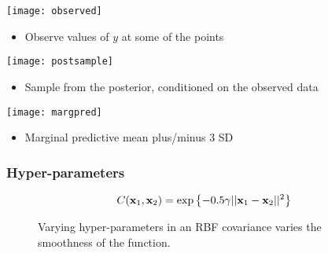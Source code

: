 \begin{frame}
	\texttt{[image: observed]}
	\begin{itemize}
		\item Observe values of $y$ at some of the points
	\end{itemize}
\end{frame}

\begin{frame}
	\texttt{[image: postsample]}
	\begin{itemize}
		\item Sample from the posterior, conditioned on the observed data
	\end{itemize}
\end{frame}

\begin{frame}
	\texttt{[image: margpred]}
	\begin{itemize}
		\item Marginal predictive mean plus/minus 3 SD 
	\end{itemize}
\end{frame}


\begin{frame}
	\frametitle{Hyper-parameters}
	\[
C(\mathbf{x}_1,\mathbf{x}_2) = \exp\left\{-0.5\gamma ||\mathbf{x}_1 - \mathbf{x}_2||^2 \right\}
	\]
	\begin{figure}[tbh]
		\centering\caption{\label{fig:hyper}Varying hyper-parameters in an RBF covariance varies the smoothness of the function.}
	\end{figure}
\end{frame}




